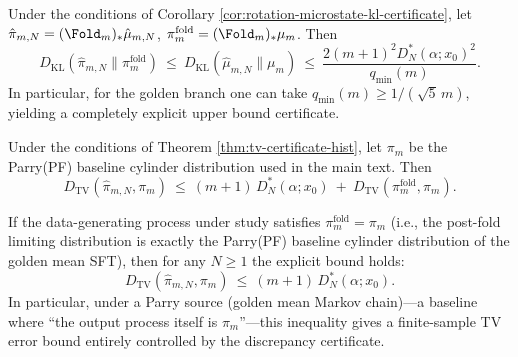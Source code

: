 \begin{corollary}\label{cor:rotation-folded-kl-certificate}
Under the conditions of Corollary \ref{cor:rotation-microstate-kl-certificate}, let $\hat\pi_{m,N}=(\Fold_m)_*\hat\mu_{m,N}$, $\pi_m^{\mathrm{fold}}=(\Fold_m)_*\mu_m$. Then
\[
D_{\mathrm{KL}}(\hat\pi_{m,N}\|\pi_m^{\mathrm{fold}})\ \le\ D_{\mathrm{KL}}(\hat\mu_{m,N}\|\mu_m)\ \le\ \frac{2(m+1)^2D_N^*(\alpha;x_0)^2}{q_{\min}(m)}.
\]
In particular, for the golden branch one can take $q_{\min}(m)\ge 1/(\sqrt5\,m)$, yielding a completely explicit upper bound certificate.
\end{corollary}



\begin{corollary}\label{cor:tv-decomposition-parry}
Under the conditions of Theorem \ref{thm:tv-certificate-hist}, let $\pi_m$ be the Parry(PF) baseline cylinder distribution used in the main text. Then
\[
D_{\mathrm{TV}}(\hat{\pi}_{m,N},\pi_m)
\ \le\
(m+1)\,D_N^*(\alpha;x_0)\ +\ D_{\mathrm{TV}}(\pi_m^{\mathrm{fold}},\pi_m).
\]
\end{corollary}

\begin{corollary}\label{cor:tv-to-parry-when-gap-zero}
If the data-generating process under study satisfies
\(
\pi_m^{\mathrm{fold}}=\pi_m
\)
(i.e., the post-fold limiting distribution is exactly the Parry(PF) baseline cylinder distribution of the golden mean SFT), then for any $N\ge 1$ the explicit bound holds:
\[
D_{\mathrm{TV}}(\hat{\pi}_{m,N},\pi_m)\ \le\ (m+1)\,D_N^*(\alpha;x_0).
\]
In particular, under a Parry source (golden mean Markov chain)---a baseline where ``the output process itself is $\pi_m$''---this inequality gives a finite-sample TV error bound entirely controlled by the discrepancy certificate.
\end{corollary}

